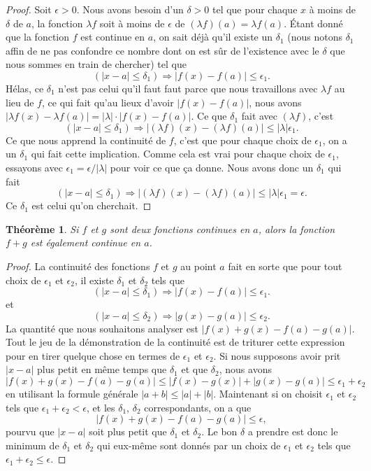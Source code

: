 \documentclass[a4paper,12pt]{book}
\newcounter{numtho}
\theoremstyle{mes_exemples}	\newtheorem{exemple}[numtho]{Exemple}
\theoremstyle{mes_tho}
\newtheorem{theorem}[numtho]{Théorème}
\begin{document}
\begin{proof}
Soit $\epsilon>0$. Nous avons besoin d'un $\delta>0$ tel que pour chaque $x$ à moins de $\delta$ de $a$, la fonction $\lambda f$ soit à moins de $\epsilon$ de $(\lambda f)(a)=\lambda f(a)$. Étant donné que la fonction $f$ est continue en $a$, on sait déjà qu'il existe un $\delta_1$ (nous notons $\delta_1$ affin de ne pas confondre ce nombre dont on est sûr de l'existence avec le $\delta$ que nous sommes en train de chercher) tel que 
\[ 
  (| x-a |\leq \delta_1)\Rightarrow | f(x)-f(a) |\leq \epsilon_1.
\]
Hélas, ce $\delta_1$ n'est pas celui qu'il faut faut parce que nous travaillons avec $\lambda f$ au lieu de $f$, ce qui fait qu'au lieux d'avoir $| f(x)-f(a) |$, nous avons $| \lambda f(x)-\lambda f(a) |=| \lambda |\cdot | f(x)-f(a) |$.  Ce que $\delta_1$ fait avec $(\lambda f)$, c'est
\[ 
  (| x-a |\leq\delta_1)\Rightarrow  | (\lambda f)(x)- (\lambda f)(a)|\leq | \lambda |\epsilon_1.
\]
Ce que nous apprend la continuité de $f$, c'est que pour chaque choix de $\epsilon_1$, on a un $\delta_1$ qui fait cette implication. Comme cela est vrai pour chaque choix de $\epsilon_1$, essayons avec $\epsilon_1=\epsilon/| \lambda |$ pour voir ce que ça donne. Nous avons donc un $\delta_1$ qui fait
\[ 
  (| x-a |\leq\delta_1)\Rightarrow  | (\lambda f)(x)- (\lambda f)(a)|\leq | \lambda |\epsilon_1=\epsilon.
\]
Ce $\delta_1$ est celui qu'on cherchait. 
\end{proof}

\begin{theorem}
Si $f$ et $g$ sont deux fonctions continues en $a$, alors la fonction $f+g$ est également continue en $a$.
\end{theorem}

\begin{proof}
La continuité des fonctions $f$ et $g$ au point $a$ fait en sorte que pour tout choix de $\epsilon_1$ et $\epsilon_2$, il existe $\delta_1$ et $\delta_2$ tels que 
\[ 
  (| x-a |\leq \delta_1)\Rightarrow | f(x)-f(a) |\leq \epsilon_1.
\]
et
\[ 
  (| x-a |\leq \delta_2)\Rightarrow | g(x)-g(a) |\leq \epsilon_2.
\]
La quantité que nous souhaitons analyser est $| f(x)+g(x)-f(a)-g(a) |$. Tout le jeu de la démonstration de la continuité est de triturer cette expression pour en tirer quelque chose en termes de $\epsilon_1$ et $\epsilon_2$. Si nous supposons avoir prit $| x-a |$ plus petit en même temps que $\delta_1$ et que $\delta_2$, nous avons
\[
| f(x)+g(x)-f(a)-g(a) |\leq| f(x)-g(x) |+| g(x)-g(a) |\leq\epsilon_1+\epsilon_2 
\]
en utilisant la formule générale $| a+b |\leq | a |+| b |$. Maintenant si on choisit $\epsilon_1$ et $\epsilon_2$ tels que $\epsilon_1+\epsilon_2<\epsilon$, et les $\delta_1$, $\delta_2$ correspondants, on a que 
\[
| f(x)+g(x)-f(a)-g(a) |\leq\epsilon,
\]
pourvu que $| x-a |$ soit plus petit que $\delta_1$ et $\delta_2$. Le bon $\delta$ a prendre est donc le minimum de $\delta_1$ et $\delta_2$ qui eux-même sont donnés par un choix de $\epsilon_1$ et $\epsilon_2$ tels que $\epsilon_1+\epsilon_2\leq\epsilon$.
\end{proof}
\end{document}
